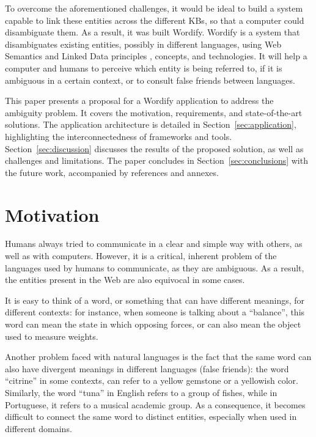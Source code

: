 \documentclass[twocolumn,twoside,11pt,a4paper]{article}
\begin{document}
To overcome the aforementioned challenges, it would be ideal to build a system capable to link these entities across the different KBs, so that a computer could disambiguate them. As a result, it was built Wordify. Wordify is a system that disambiguates existing entities, possibly in different languages, using Web Semantics and Linked Data principles \cite{kn:tbl}, concepts, and technologies. It will help a computer and humans to perceive which entity is being referred to, if it is ambiguous in a certain context, or to consult false friends between languages.

This paper presents a proposal for a Wordify application to address the ambiguity problem. It covers the motivation, requirements, and state-of-the-art solutions. The application architecture is detailed in Section~\ref{sec:application}, highlighting the interconnectedness of frameworks and tools. Section~\ref{sec:discussion} discusses the results of the proposed solution, as well as challenges and limitations. The paper concludes in Section~\ref{sec:conclusions} with the future work, accompanied by references and annexes.


\section{Motivation}\label{sec:motivation}

Humans always tried to communicate in a clear and simple way with others, as well as with computers. However, it is a critical, inherent problem of the languages used by humans to communicate, as they are ambiguous. As a result, the entities present in the Web are also equivocal in some cases.

It is easy to think of a word, or something that can have different meanings, for different contexts: for instance, when someone is talking about a ``balance'', this word can mean the state in which opposing forces, or can also mean the object used to measure weights.

Another problem faced with natural languages is the fact that the same word can also have divergent meanings in different languages (false friends): the word ``citrine'' in some contexts, can refer to a yellow gemstone or a yellowish color. Similarly, the word ``tuna'' in English refers to a group of fishes, while in Portuguese, it refers to a musical academic group. As a consequence, it becomes difficult to connect the same word to distinct entities, especially when used in different domains.
\end{document}

